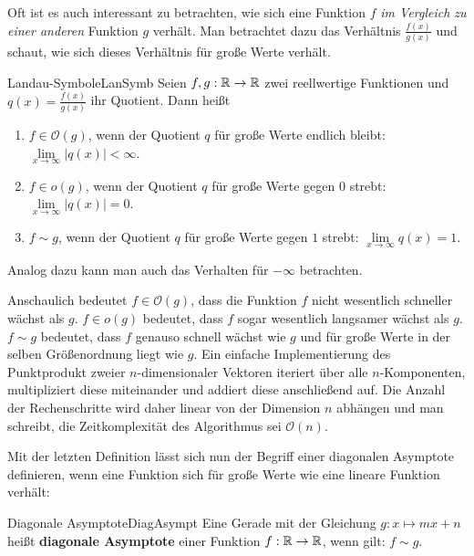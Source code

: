 Oft ist es auch interessant zu betrachten, wie sich eine Funktion $f$ \emph{im Vergleich zu einer anderen} Funktion $g$ verhält. Man betrachtet dazu das Verhältnis $\frac{f(x)}{g(x)}$ und schaut, wie sich dieses Verhältnis für große Werte verhält.

\begin{definition}{Landau-Symbole}{LanSymb}
    Seien $f,g: \mathbb{R} \to \mathbb{R}$ zwei reellwertige Funktionen und $q(x) = \frac{f(x)}{g(x)}$ ihr Quotient. Dann heißt
    \begin{enumerate}
        \item $f \in \mathcal{O}(g)$, wenn der Quotient $q$ für große Werte endlich bleibt: $\lim\limits_{x\to\infty} |q(x)| < \infty$.
        \item $f \in o(g)$, wenn der Quotient $q$ für große Werte gegen $0$ strebt: $\lim\limits_{x\to\infty} |q(x)| = 0$.
        \item $f \sim g$, wenn der Quotient $q$ für große Werte gegen $1$ strebt: $\lim\limits_{x\to\infty} q(x) = 1$.
    \end{enumerate}
    Analog dazu kann man auch das Verhalten für $-\infty$ betrachten.
\end{definition}

Anschaulich bedeutet $f \in \mathcal{O}(g)$, dass die Funktion $f$ nicht wesentlich schneller wächst als $g$. $f \in o(g)$ bedeutet, dass $f$ sogar wesentlich langsamer wächst als $g$. $f \sim g$ bedeutet, dass $f$ genauso schnell wächst wie $g$ und für große Werte in der selben Größenordnung liegt wie $g$. Ein einfache Implementierung des Punktprodukt zweier $n$-dimensionaler Vektoren iteriert über alle $n$-Komponenten, multipliziert diese miteinander und addiert diese anschließend auf. Die Anzahl der Rechenschritte wird daher linear von der Dimension $n$ abhängen und man schreibt, die Zeitkomplexität des Algorithmus sei $\mathcal{O}(n)$.

Mit der letzten Definition lässt sich nun der Begriff einer diagonalen Asymptote definieren, wenn eine Funktion sich für große Werte wie eine lineare Funktion verhält:

\begin{definition}{Diagonale Asymptote}{DiagAsympt}
    Eine Gerade mit der Gleichung $g: x \mapsto mx+n$ heißt \textbf{diagonale Asymptote} einer Funktion $f: \mathbb{R} \to \mathbb{R}$, wenn gilt: $f \sim g$.
\end{definition}

